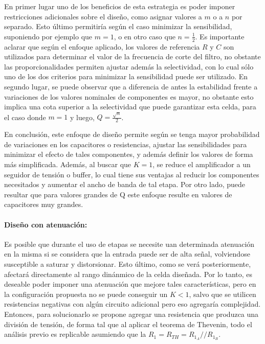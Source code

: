 En primer lugar uno de los beneficios de esta estrategia es poder imponer restricciones adicionales sobre el dise\~no, como asignar valores a $m$ o a $n$ por separado. Esto \'ultimo permitir\'ia seg\'un
el caso minimizar la sensibilidad, suponiendo por ejemplo que $m = 1$, o en otro caso que $n = \frac{1}{2}$. Es importante aclarar que seg\'un el enfoque aplicado, los valores de referencia $R$ y $C$ son utilizados
para determinar el valor de la frecuencia de corte del filtro, no obstante las proporcionalidades permiten ajustar adem\'as la selectividad, con lo cual s\'olo uno de los dos criterios para minimizar la sensibilidad puede ser utilizado.
En segundo lugar, se puede observar que a diferencia de antes la estabilidad frente a variaciones de los valores nominales de componentes es mayor, no obstante esto implica una cota superior a la selectividad que puede garantizar esta celda,
para el caso donde $m = 1$ y luego, $Q = \frac{\sqrt{n}}{2}$.

En conclusi\'on, este enfoque de dise\~no permite seg\'un se tenga mayor probabilidad de variaciones en los capacitores o resistencias, ajustar las sensibilidades para minimizar el efecto de tales componentes,
y adem\'as definir los valores de forma m\'as simplificada. Adem\'as, al buscar que $K = 1$, se reduce el amplificador a un seguidor de tensi\'on o buffer, lo cual tiene sus ventajas al reducir los componentes necesitados
y aumentar el ancho de banda de tal etapa. Por otro lado, puede resultar que para valores grandes de Q este enfoque resulte en valores de capacitores muy grandes.

\paragraph{Dise\~no con atenuaci\'on:} Es posible que durante el uso de etapas se necesite uan determinada atenuaci\'on en la misma si se considera que la entrada puede ser de alta se\~nal, volviendose susceptible a saturar
y distorsionar. Esto \'ultimo, como se ver\'a posteriormente, afectar\'a directamente al rango din\'anmico de la celda dise\~nada. Por lo tanto, es deseable poder imponer una atenuaci\'on que mejore tales caracter\'isticas, pero en la
configuraci\'on propuesta no se puede conseguir un $K < 1$, salvo que se utilicen resistencias negativas con alg\'un circuito adicional pero eso agregar\'ia complejidad. Entonces, para solucionarlo se propone agregar una resistencia que produzca
una divisi\'on de tensi\'on, de forma tal que al aplicar el teorema de Thevenin, todo el an\'alisis previo es replicable asumiendo que la $R_1 = R_{TH} = R_{1_A} // R_{1_B}$.


